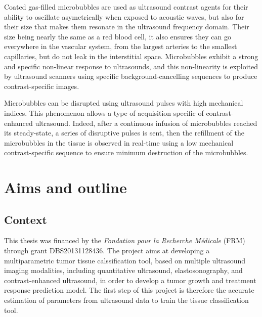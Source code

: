 Coated gas-filled microbubbles are used as ultrasound contrast agents for their ability to oscillate asymetrically when exposed to acoustic waves, but also for their size that makes them resonate in the ultrasound frequency domain.
Their size being nearly the same as a red blood cell, it also ensures they can go everywhere in the vascular system, from the largest arteries to the smallest capillaries, but do not leak in the interstitial space.
Microbubbles exhibit a strong and specific non-linear response to ultrasounds, and this non-linearity is exploited by ultrasound scanners using specific background-cancelling sequences to produce contrast-specific images.

Microbubbles can be disrupted using ultrasound pulses with high mechanical indices.
This phenomenon allows a type of acquisition specific of contrast-enhanced ultrasound. 
Indeed, after a continuous infusion of microbubbles reached its steady-state, a series of disruptive pulses is sent, then the refillment of the microbubbles in the tissue is observed in real-time using a low mechanical contrast-specific sequence to ensure minimum destruction of the microbubbles.


\section{Aims and outline}
\label{sec:IntroAimsOutline}
\subsection{Context}
This thesis was financed by the {\em Fondation pour la Recherche M\'edicale} (FRM) through grant DBS20131128436.
The project aims at developing a multiparametric tumor tissue calssification tool, based on multiple ultrasound imaging modalities, including quantitative ultrasound, elastosonography, and contrast-enhanced ultrasound, in order to develop a tumor growth and treatment response prediction model.
The first step of this project is therefore the accurate estimation of parameters from ultrasound data to train the tissue classification tool.

